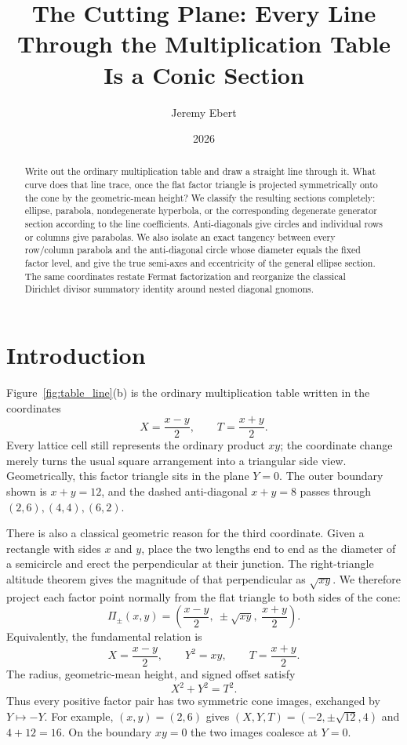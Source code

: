 \documentclass[11pt]{amsart}
\title{The Cutting Plane: Every Line Through the Multiplication Table Is a Conic Section}
\author{Jeremy Ebert}
\date{2026}
\theoremstyle{remark}
\numberwithin{equation}{section}
\begin{document}
\pagestyle{plain}
\maketitle

\begin{abstract}
Write out the ordinary multiplication table and draw a straight line through it. What curve does that line trace, once the flat factor triangle is projected symmetrically onto the cone by the geometric-mean height? We classify the resulting sections completely: ellipse, parabola, nondegenerate hyperbola, or the corresponding degenerate generator section according to the line coefficients. Anti-diagonals give circles and individual rows or columns give parabolas. We also isolate an exact tangency between every row/column parabola and the anti-diagonal circle whose diameter equals the fixed factor level, and give the true semi-axes and eccentricity of the general ellipse section. The same coordinates restate Fermat factorization and reorganize the classical Dirichlet divisor summatory identity around nested diagonal gnomons.
\end{abstract}

\section{Introduction}
Figure~\ref{fig:table_line}(b) is the ordinary multiplication table written in the coordinates
\begin{equation}
X=\frac{x-y}{2},\qquad T=\frac{x+y}{2}.
\end{equation}
Every lattice cell still represents the ordinary product $xy$; the coordinate change merely turns the usual square arrangement into a triangular side view. Geometrically, this factor triangle sits in the plane $Y=0$. The outer boundary shown is $x+y=12$, and the dashed anti-diagonal $x+y=8$ passes through $(2,6),(4,4),(6,2)$.

There is also a classical geometric reason for the third coordinate. Given a rectangle with sides $x$ and $y$, place the two lengths end to end as the diameter of a semicircle and erect the perpendicular at their junction. The right-triangle altitude theorem gives the magnitude of that perpendicular as $\sqrt{xy}$. We therefore project each factor point normally from the flat triangle to both sides of the cone:
\begin{equation}
\Pi_\pm(x,y)=\left(\frac{x-y}{2},\ \pm\sqrt{xy},\ \frac{x+y}{2}\right).
\end{equation}
Equivalently, the fundamental relation is
\begin{equation}
X=\frac{x-y}{2},\qquad Y^2=xy,\qquad T=\frac{x+y}{2}.
\end{equation}
The radius, geometric-mean height, and signed offset satisfy
\begin{equation}
X^2+Y^2=T^2.
\end{equation}
Thus every positive factor pair has two symmetric cone images, exchanged by $Y\mapsto-Y$. For example, $(x,y)=(2,6)$ gives $(X,Y,T)=(-2,\pm\sqrt{12},4)$ and $4+12=16$. On the boundary $xy=0$ the two images coalesce at $Y=0$.
\end{document}
